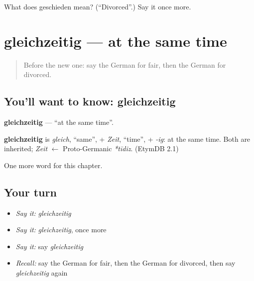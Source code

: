 \begin{tcolorbox}[breakable,colback=teal!4,colframe=teal!35!black,title={Before you move on}]
What does geschieden mean? (\textquotedblleft{}Divorced\textquotedblright{}.) Say it once more.
\end{tcolorbox}
\section[gleichzeitig]{gleichzeitig — at the same time}

\label{lesson:GE-C215-gleichzeitig}



\begin{quote}
Before the new one: say the German for fair, then the German for divorced.
\end{quote}

\subsection*{You'll want to know: gleichzeitig}
\textbf{gleichzeitig} — \textquotedblleft{}at the same time\textquotedblright{}.

\begin{cousinweb}
\textbf{gleichzeitig} is \emph{gleich}, \textquotedblleft{}same\textquotedblright{}, + \emph{Zeit}, \textquotedblleft{}time\textquotedblright{}, + \emph{-ig}: at the same time. Both are inherited; \emph{Zeit} $\leftarrow$ Proto-Germanic \emph{*tīdiz}. (EtymDB 2.1)
\end{cousinweb}

\begin{grammarlens}[title={What you've built}]
One more word for this chapter.
\end{grammarlens}

\subsection*{Your turn}
\begin{itemize}
\raggedright
  \item \emph{Say it:} \emph{gleichzeitig}
  \item \emph{Say it:} \emph{gleichzeitig}, once more
  \item \emph{Say it:} say \emph{gleichzeitig}
  \item \emph{Recall:} say the German for fair, then the German for divorced, then say \emph{gleichzeitig} again
\end{itemize}

